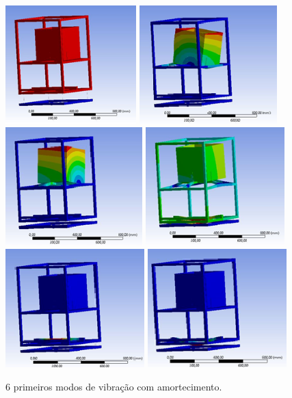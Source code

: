 \begin{figure}[H]
	\centering
	\includegraphics[height=130pt]{figuras/modo2_1.png}
	\includegraphics[height=130pt]{figuras/modo2_2.png}
	\includegraphics[height=130pt]{figuras/modo2_3.png}
	\includegraphics[height=130pt]{figuras/modo2_4.png}
	\includegraphics[height=130pt]{figuras/modo2_5.png}
	\includegraphics[height=130pt]{figuras/modo2_6.png}
	\caption{6 primeiros modos de vibração com amortecimento.}
\end{figure}

